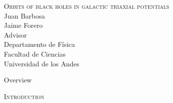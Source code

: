 \documentclass{beamer}
\begin{document}
\begin{frame}
	\centering
	\textsc{\LARGE Orbits of black holes in galactic triaxial potentials}
	\\
	\vspace{2.5cm}
	Juan Barbosa\\
	\vspace{1cm}
	\small
	Jaime Forero\\ 
	Advisor\\
	\vspace{0.5cm}
	\footnotesize
	Departamento de F\'isica\\
	Facultad de Ciencias\\
	Universidad de los Andes
\end{frame}

\begin{frame}{Overview}
	\tableofcontents
\end{frame}

\begin{frame}
	\centering
	\Huge
	\scshape
	Introduction
\end{frame}
\end{document}
